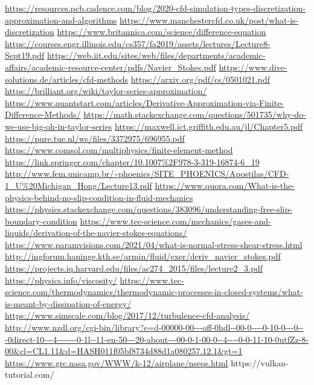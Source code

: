 \documentclass{article}
\begin{document}
\begin{thebibliography}{3}
\url{https://resources.pcb.cadence.com/blog/2020-cfd-simulation-types-discretization-approximation-and-algorithms}
\url{https://www.manchestercfd.co.uk/post/what-is-discretization}
\url{https://www.britannica.com/science/difference-equation}
\url{https://courses.engr.illinois.edu/cs357/fa2019/assets/lectures/Lecture8-Sept19.pdf}
\url{https://web.iit.edu/sites/web/files/departments/academic-affairs/academic-resource-center/pdfs/Navier_Stokes.pdf}
\url{https://www.dive-solutions.de/articles/cfd-methods}
\url{https://arxiv.org/pdf/cs/0501021.pdf}
\url{https://brilliant.org/wiki/taylor-series-approximation/}
\url{https://www.quantstart.com/articles/Derivative-Approximation-via-Finite-Difference-Methods/}
\url{https://math.stackexchange.com/questions/501735/why-do-we-use-big-oh-in-taylor-series}
\url{https://maxwell.ict.griffith.edu.au/jl/Chapter5.pdf}
\url{https://pure.tue.nl/ws/files/3372975/696955.pdf}
\url{https://www.comsol.com/multiphysics/finite-element-method}
\url{https://link.springer.com/chapter/10.1007\%2F978-3-319-16874-6\_19}
\url{http://www.fem.unicamp.br/~phoenics/SITE_PHOENICS/Apostilas/CFD-1_U\%20Michigan_Hong/Lecture13.pdf}
\url{https://www.quora.com/What-is-the-physics-behind-no-slip-condition-in-fluid-mechanics}
\url{https://physics.stackexchange.com/questions/383096/understanding-free-slip-boundary-condition}
\url{https://www.tec-science.com/mechanics/gases-and-liquids/derivation-of-the-navier-stokes-equations/}
\url{https://www.paramvisions.com/2021/04/what-is-normal-stress-shear-stress.html}
\url{http://ingforum.haninge.kth.se/armin/fluid/exer/deriv_navier_stokes.pdf}
\url{https://projects.iq.harvard.edu/files/ac274_2015/files/lecture2_3.pdf}
\url{https://physics.info/viscosity/}
\url{https://www.tec-science.com/thermodynamics/thermodynamic-processes-in-closed-systems/what-is-meant-by-dissipation-of-energy/}
\url{https://www.simscale.com/blog/2017/12/turbulence-cfd-analysis/}
\url{http://www.nzdl.org/cgi-bin/library?e=d-00000-00---off-0hdl--00-0----0-10-0---0---0direct-10---4-------0-1l--11-en-50---20-about---00-0-1-00-0--4----0-0-11-10-0utfZz-8-00\&cl=CL1.11\&d=HASH011f05bf8734d88d1a080257.12.1\&gt=1}
\url{https://www.grc.nasa.gov/WWW/k-12/airplane/nseqs.html}
https://vulkan-tutorial.com/
\end{thebibliography}
\end{document}
